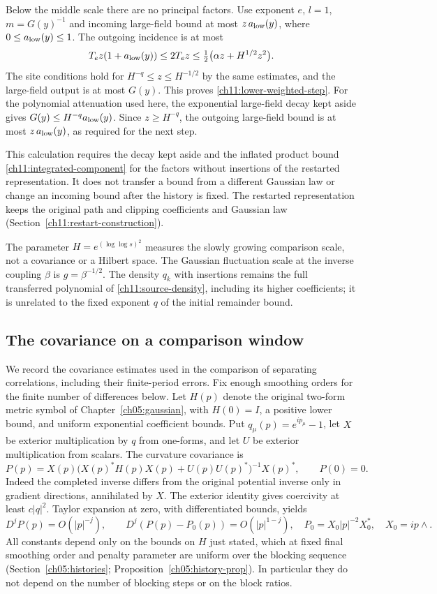 Below the middle scale there are no principal factors.
Use exponent $e$, $l=1$, $m=G(y)^{-1}$ and incoming large-field
bound at most $z\,a_{\rm low}(y)$, where
$0\le a_{\rm low}(y)\le1$. The outgoing incidence is at most
\[
 T_ez(1+a_{\rm low}(y))
 \le2T_ez\le\tfrac12\bigl(\alpha z+H^{1/2}z^2\bigr).
\]
The site conditions hold for $H^{-q}\le z\le H^{-1/2}$
by the same estimates, and the large-field output is at most $G(y)$.
This proves \eqref{ch11:lower-weighted-step}.
For the polynomial attenuation used here, the exponential
large-field decay kept aside gives $G(y)\le H^{-q}a_{\rm low}(y)$. Since
$z\ge H^{-q}$, the outgoing large-field bound is at most
$z\,a_{\rm low}(y)$, as required for the next step.

This calculation requires the decay kept aside and the inflated product bound
\eqref{ch11:integrated-component} for the factors without insertions of the restarted representation.
It does not transfer a bound from a different Gaussian law or
change an incoming bound after the history is fixed.
The restarted representation keeps the original path and clipping coefficients and Gaussian law (Section~\ref{ch11:restart-construction}).

The parameter $H=e^{(\log\log s)^2}$ measures the slowly growing
comparison scale, not a covariance or a Hilbert space.
The Gaussian fluctuation scale at the inverse coupling $\beta$ is $g=\beta^{-1/2}$.
The density $q_k$ with insertions remains the full transferred polynomial of
\eqref{ch11:source-density}, including its higher coefficients;
it is unrelated to the fixed exponent $q$ of the initial remainder bound.

\subsection{The covariance on a comparison window}
\label{ch11:window-covariance}

We record the covariance estimates used in the comparison of separating correlations,
including their finite-period errors. Fix enough smoothing orders for
the finite number of differences below. Let $H(p)$ denote the original
two-form metric symbol of Chapter~\ref{ch05:gaussian}, with
$H(0)=I$, a positive lower bound, and uniform exponential coefficient
bounds. Put $q_\mu(p)=e^{ip_\mu}-1$, let $X$ be exterior
multiplication by $q$ from one-forms, and let $U$ be exterior
multiplication from scalars. The curvature covariance is
\[
 P(p)=X(p)\bigl(X(p)^*H(p)X(p)+U(p)U(p)^*\bigr)^{-1}X(p)^*,
 \qquad P(0)=0.
\]
Indeed the completed inverse differs from the original potential
inverse only in gradient directions, annihilated by $X$.
The exterior identity gives coercivity at least
$c|q|^2$. Taylor expansion at zero, with differentiated bounds, yields
\[
 D^jP(p)=O(|p|^{-j}),\qquad
 D^j(P(p)-P_0(p))=O(|p|^{1-j}),
 \quad P_0=X_0|p|^{-2}X_0^*,\quad X_0=ip\wedge.
\]
All constants depend only on the bounds on $H$ just stated, which at fixed final smoothing order and penalty parameter are uniform over the blocking sequence (Section~\ref{ch05:histories}; Proposition~\ref{ch05:history-prop}). In particular they do not depend on the number of blocking steps or on the block ratios.

